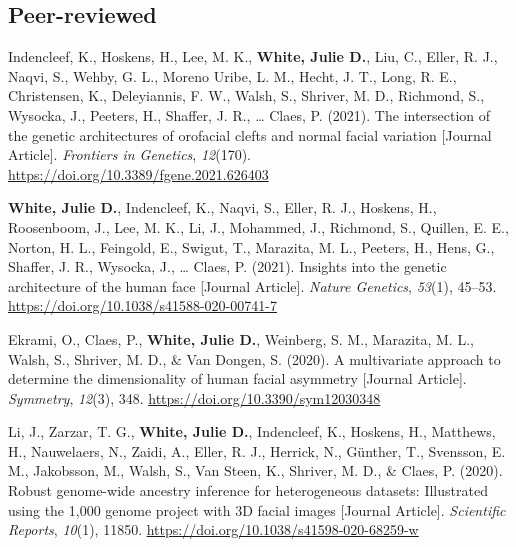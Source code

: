 \documentclass[11pt, a4paper]{awesome-cv}
\begin{document}
\endgroup

\hypertarget{peer-reviewed}{%
\subsection{Peer-reviewed}\label{peer-reviewed}}

\begingroup
\setlength{\parindent}{-0.5in}
\setlength{\leftskip}{0.5in}

\hypertarget{refs_published}{}
\leavevmode\hypertarget{ref-Indencleef_2021_NSCLP}{}%
Indencleef, K., Hoskens, H., Lee, M. K., \textbf{White, Julie D.}, Liu,
C., Eller, R. J., Naqvi, S., Wehby, G. L., Moreno Uribe, L. M., Hecht,
J. T., Long, R. E., Christensen, K., Deleyiannis, F. W., Walsh, S.,
Shriver, M. D., Richmond, S., Wysocka, J., Peeters, H., Shaffer, J. R.,
\ldots{} Claes, P. (2021). The intersection of the genetic architectures
of orofacial clefts and normal facial variation {[}Journal Article{]}.
\emph{Frontiers in Genetics}, \emph{12}(170).
\url{https://doi.org/10.3389/fgene.2021.626403}

\leavevmode\hypertarget{ref-White_Indencleef_2021_MetaGWAS}{}%
\textbf{White, Julie D.}, Indencleef, K., Naqvi, S., Eller, R. J.,
Hoskens, H., Roosenboom, J., Lee, M. K., Li, J., Mohammed, J., Richmond,
S., Quillen, E. E., Norton, H. L., Feingold, E., Swigut, T., Marazita,
M. L., Peeters, H., Hens, G., Shaffer, J. R., Wysocka, J., \ldots{}
Claes, P. (2021). Insights into the genetic architecture of the human
face {[}Journal Article{]}. \emph{Nature Genetics}, \emph{53}(1),
45--53. \url{https://doi.org/10.1038/s41588-020-00741-7}

\leavevmode\hypertarget{ref-Ekrami_2020_MultivariateAsymmetry}{}%
Ekrami, O., Claes, P., \textbf{White, Julie D.}, Weinberg, S. M.,
Marazita, M. L., Walsh, S., Shriver, M. D., \& Van Dongen, S. (2020). A
multivariate approach to determine the dimensionality of human facial
asymmetry {[}Journal Article{]}. \emph{Symmetry}, \emph{12}(3), 348.
\url{https://doi.org/10.3390/sym12030348}

\leavevmode\hypertarget{ref-Li_2020_AncestryInference}{}%
Li, J., Zarzar, T. G., \textbf{White, Julie D.}, Indencleef, K.,
Hoskens, H., Matthews, H., Nauwelaers, N., Zaidi, A., Eller, R. J.,
Herrick, N., Günther, T., Svensson, E. M., Jakobsson, M., Walsh, S., Van
Steen, K., Shriver, M. D., \& Claes, P. (2020). Robust genome-wide
ancestry inference for heterogeneous datasets: Illustrated using the
1,000 genome project with 3D facial images {[}Journal Article{]}.
\emph{Scientific Reports}, \emph{10}(1), 11850.
\url{https://doi.org/10.1038/s41598-020-68259-w}
\end{document}
